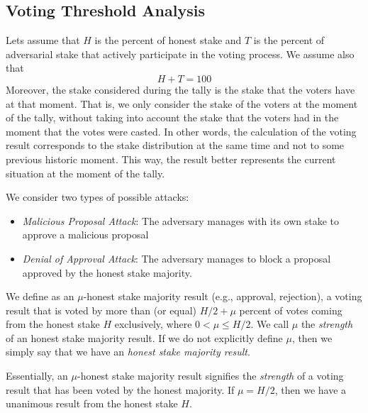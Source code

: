 \subsection{Voting Threshold Analysis}
Lets assume that $H$ is the percent of honest stake and $T$ is the percent of 
adversarial stake that actively participate in the voting process. We assume 
also that
\begin{equation}\label{eq:H_plus_T}
	H+T=100    
\end{equation}
Moreover, the stake considered during the tally is the stake that the voters 
have at that moment. That is, we only consider the stake of the voters at the 
moment of the tally, without taking into account the stake that the voters had 
in the moment that the votes were casted. In other words, the calculation of 
the 
voting result corresponds to the stake distribution at the same time and not to 
some previous historic moment. This way, the result better represents the 
current situation at the moment of the tally.

We consider two types of possible attacks:
\begin{itemize}
	\item \emph{Malicious Proposal Attack}: The adversary manages with its own 
	stake to approve a malicious proposal
	\item \emph{Denial of Approval Attack}: The adversary manages to block a 
	proposal approved by the honest stake majority.
\end{itemize}


\begin{definition}
	We define as an $\mu$-honest stake majority result (e.g., approval, 
	rejection), a voting result that is voted by more than (or equal) $H/2 + 
	\mu$ percent of votes coming from the honest stake $H$ exclusively, where 
	$0 < \mu \leq H/2$. We call $\mu$ the \emph{strength} of an honest stake 
	majority result. If we do not explicitly define $\mu$, then we simply say 
	that we have an \emph{honest stake majority result}.
\end{definition}
Essentially, an $\mu$-honest stake majority result signifies the 
\emph{strength} of a voting result that has been voted by the honest majority. 
If $\mu = H/2$, then we have a unanimous result from the honest stake $H$.

